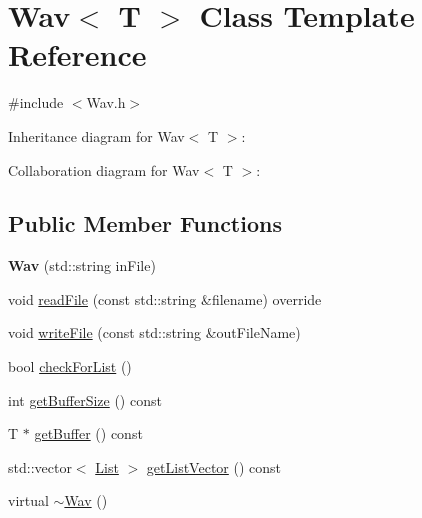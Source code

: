\hypertarget{classWav}{}\section{Wav$<$ T $>$ Class Template Reference}
\label{classWav}


{\ttfamily \#include $<$Wav.\+h$>$}



Inheritance diagram for Wav$<$ T $>$\+:


Collaboration diagram for Wav$<$ T $>$\+:
\subsection*{Public Member Functions}
\begin{DoxyCompactItemize}
\item 
\mbox{\label{classWav_ab265f0e3e012960f531ed5ff242c4e52}} 
{\bfseries Wav} (std\+::string in\+File)
\item 
void \hyperlink{classWav_a636a94bf0f23a4cdc9d8d59d9d567f3e}{read\+File} (const std\+::string \&filename) override
\item 
void \hyperlink{classWav_afbae07371a8e0f17cc8e3a29507016e3}{write\+File} (const std\+::string \&out\+File\+Name)
\item 
bool \hyperlink{classWav_ae484d2f0d2ce244ed23b99be6ea43977}{check\+For\+List} ()
\item 
int \hyperlink{classWav_afd1ee6d72bb1bac1284a0df3ae7d9cea}{get\+Buffer\+Size} () const
\item 
T $\ast$ \hyperlink{classWav_adc3bc9bcc037ff83bc7544715e70e144}{get\+Buffer} () const
\item 
std\+::vector$<$ \hyperlink{structList}{List} $>$ \hyperlink{classWav_ad974c0f10e70e23d689d60591aa90456}{get\+List\+Vector} () const
\item 
virtual \hyperlink{classWav_a54ee39542f46929187c7a9e032250bdf}{$\sim$\+Wav} ()
\end{DoxyCompactItemize}
